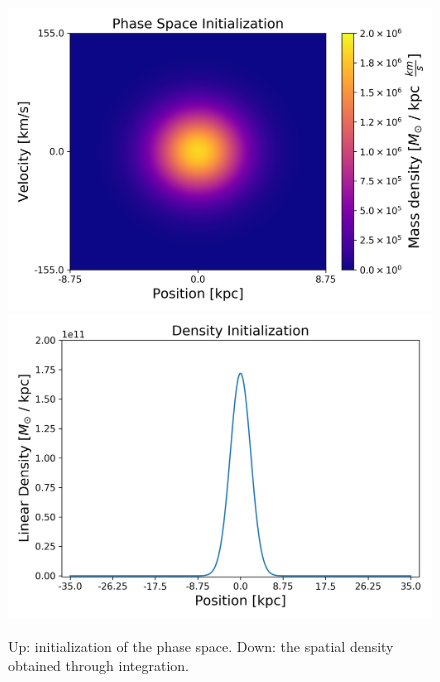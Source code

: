 \begin{figure}[ht!]
    \centering
    \includegraphics[scale=0.6]{imag/1dInitPS.png}
    \includegraphics[scale=0.6]{imag/1dInitDens.png}
    \caption{Up: initialization of the phase space. Down: the spatial density obtained through integration.}
    \label{1dInit}
\end{figure}
\newpage
